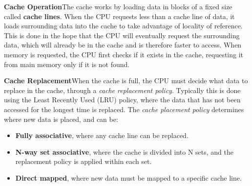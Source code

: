 \documentclass{article}
\begin{document}
\textbf{Cache Operation}\quad The cache works by loading data in blocks of a fixed size called
\textbf{cache lines}. When the CPU requests less than a cache line of
data, it loads surrounding data into the cache to take advantage of
locality of reference. This is done in the hope that the CPU will
eventually request the surrounding data, which will already be in the
cache and is therefore faster to access. When memory is requested, the
CPU first checks if it exists in the cache, requesting it from main
memory only if it is not found.

\textbf{Cache Replacement}\quad When the cache is full, the CPU must decide what data to replace in the
cache, through a \textit{cache replacement policy}. Typically this is
done using the Least Recently Used (LRU) policy, where the data that
has not been accessed for the longest time is replaced. The
\textit{cache placement policy} determines where new data is placed,
and can be:
\begin{itemize}
    \item \textbf{Fully associative}, where any cache line can be replaced.
    \item \textbf{N-way set associative}, where the cache is divided
          into N sets, and the replacement policy is applied within each set.
    \item \textbf{Direct mapped}, where new data must be mapped to a
          specific cache line.
\end{itemize}
\end{document}
